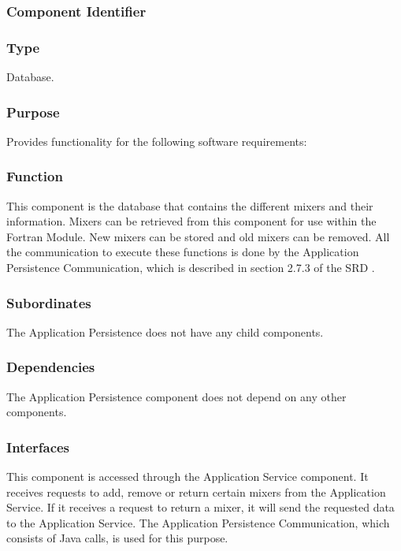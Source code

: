 \subsubsection*{Component Identifier}
\RTMSAP{}

\subsubsection*{Type}
Database.

\subsubsection*{Purpose}
Provides functionality for the following software requirements:

\noindent {}

\subsubsection*{Function}
This component is the database that contains the different mixers and their information. Mixers can be retrieved from this component for use within the Fortran Module. New mixers can be stored and old mixers can be removed. All the communication to execute these functions is done by the Application Persistence Communication, which is described in section 2.7.3 of the SRD \cite{srd}.

\subsubsection*{Subordinates}
The Application Persistence does not have any child components.

\subsubsection*{Dependencies}
The Application Persistence component does not depend on any other components.

\subsubsection*{Interfaces}
This component is accessed through the Application Service component. It receives requests to add, remove or return certain mixers from the Application Service. If it receives a request to return a mixer, it will send the requested data to the Application Service. The Application Persistence Communication, which consists of Java calls, is used for this purpose.

